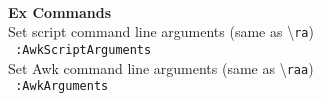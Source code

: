 \documentclass[oneside,10pt,landscape,DIV16]{scrartcl}
\begin{document}
\begin{multicols}{3}
\begin{center}
\begin{tabular}[]{|p{11mm}|p{62mm}|}
\hline
\end{tabular}\\
%
\begin{flushleft}
\large{\textbf{Ex Commands}}\\[1.0ex]
%
Set script command line arguments (same as \textbackslash\texttt{ra})\\[1.0ex]
\texttt{ :AwkScriptArguments}\\[1.0ex]
%
Set Awk command line arguments (same as \textbackslash\texttt{raa})\\[1.0ex]
\texttt{ :AwkArguments}\\[1.0ex]
\end{flushleft}
%
\end{center}%
\end{multicols}%
%
\end{document}
